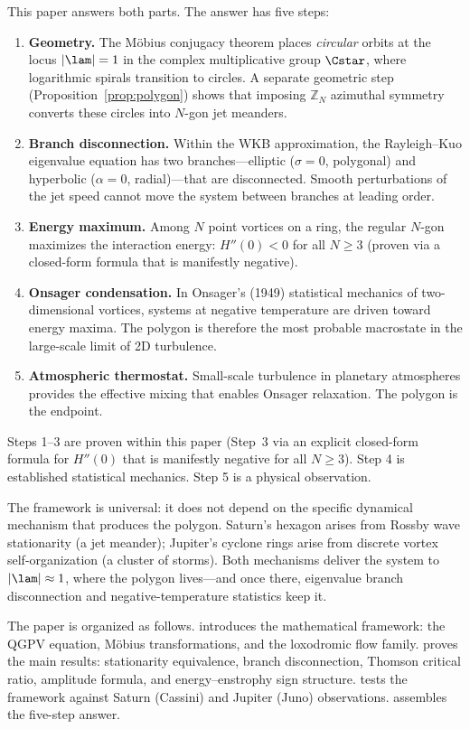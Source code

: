 This paper answers both parts.  The answer has five steps:
\begin{enumerate}
  \item \textbf{Geometry.}  The M\"obius conjugacy theorem places
    \emph{circular} orbits at the locus $|\lam| = 1$ in the complex
    multiplicative group $\Cstar$, where logarithmic spirals transition
    to circles.  A separate geometric step (Proposition~\ref{prop:polygon})
    shows that imposing $\mathbb{Z}_N$ azimuthal symmetry converts these
    circles into $N$-gon jet meanders.

  \item \textbf{Branch disconnection.}  Within the WKB approximation,
    the Rayleigh--Kuo eigenvalue equation has two branches---elliptic
    ($\sigma = 0$, polygonal) and hyperbolic ($\alpha = 0$, radial)---that
    are disconnected.  Smooth perturbations of the jet speed cannot move
    the system between branches at leading order.

  \item \textbf{Energy maximum.}  Among $N$ point vortices on a ring, the
    regular $N$-gon maximizes the interaction energy: $H''(0) < 0$ for
    all $N \ge 3$ (proven via a closed-form formula that is manifestly
    negative).

  \item \textbf{Onsager condensation.}  In Onsager's (1949) statistical
    mechanics of two-dimensional vortices, systems at negative temperature
    are driven toward energy maxima.  The polygon is therefore the most
    probable macrostate in the large-scale limit of 2D turbulence.

  \item \textbf{Atmospheric thermostat.}  Small-scale turbulence in
    planetary atmospheres provides the effective mixing that enables
    Onsager relaxation.  The polygon is the endpoint.
\end{enumerate}
Steps 1--3 are proven within this paper (Step~3 via an explicit
closed-form formula for $H''(0)$ that is manifestly negative for all
$N \ge 3$).  Step 4 is established statistical mechanics.  Step 5 is a
physical observation.

The framework is universal: it does not depend on the specific dynamical
mechanism that produces the polygon.  Saturn's hexagon arises from Rossby
wave stationarity (a jet meander); Jupiter's cyclone rings arise from
discrete vortex self-organization (a cluster of storms).  Both mechanisms
deliver the system to $|\lam| \approx 1$, where the polygon lives---and
once there, eigenvalue branch disconnection and negative-temperature
statistics keep it.

The paper is organized as follows.   introduces the
mathematical framework: the QGPV equation, M\"obius transformations, and
the loxodromic flow family.   proves the main results:
stationarity equivalence, branch disconnection, Thomson critical ratio,
amplitude formula, and energy--enstrophy sign structure.
 tests the framework against Saturn (Cassini) and
Jupiter (Juno) observations.   assembles the
five-step answer.
